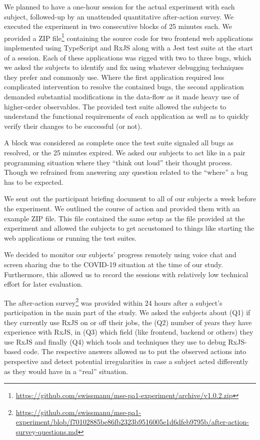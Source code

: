 \documentclass[sigplan,screen,review]{acmart}
\begin{document}
We planned to have a one-hour session for the actual experiment with each subject, followed-up by an unattended quantitative after-action survey. We executed the experiment in two consecutive blocks of 25 minutes each. We provided a ZIP file\footnote{\url{https://github.com/swissmanu/mse-pa1-experiment/archive/v1.0.2.zip}} containing the source code for two frontend web applications implemented using TypeScript and RxJS along with a Jest test suite at the start of a session. Each of these applications was rigged with two to three bugs, which we asked the subjects to identify and fix using whatever debugging techniques they prefer and commonly use. Where the first application required less complicated intervention to resolve the contained bugs, the second application demanded substantial modifications in the data-flow as it made heavy use of higher-order observables. The provided test suite allowed the subjects to understand the functional requirements of each application as well as to quickly verify their changes to be successful (or not).

A block was considered as complete once the test suite signaled all bugs as resolved, or the 25 minutes expired. We asked our subjects to act like in a pair programming situation where they ``think out loud'' their thought process. Though we refrained from answering any question related to the ``where'' a bug has to be expected.

We sent out the participant briefing document to all of our subjects a week before the experiment. We outlined the course of action and provided them with an example ZIP file. This file contained the same setup as the file provided at the experiment and allowed the subjects to get accustomed to things like starting the web applications or running the test suites.

We decided to monitor our subjects' progress remotely using voice chat and screen sharing due to the COVID-19 situation at the time of our study. Furthermore, this allowed us to record the sessions with relatively low technical effort for later evaluation.

The after-action survey\footnote{\url{https://github.com/swissmanu/mse-pa1-experiment/blob/f70102885be86fb2323b9516005e1d6dfeb9795b/after-action-survey-questions.md}} was provided within 24 hours after a subject's participation in the main part of the study. We asked the subjects about (Q1) if they currently use RxJS on or off their jobs, the (Q2) number of years they have experience with RxJS, in (Q3) which field (like frontend, backend or others) they use RxJS and finally (Q4) which tools and techniques they use to debug RxJS-based code. The respective answers allowed us to put the observed actions into perspective and detect potential irregularities in case a subject acted differently as they would have in a ``real'' situation.
\end{document}
